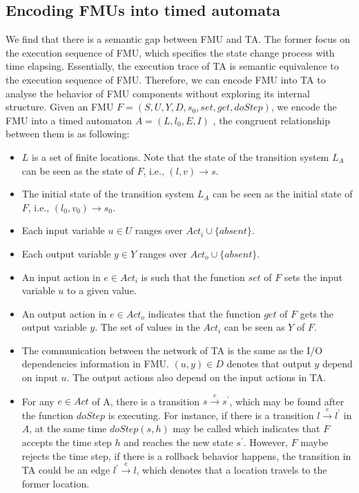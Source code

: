 \subsection{Encoding FMUs into timed automata}
We find that there is a semantic gap between FMU and TA. The former focus on the execution sequence of FMU, which specifies the state change process with time elapsing. Essentially, the execution trace of TA is semantic equivalence to the execution sequence of FMU. Therefore, we can encode FMU into TA to analyse the behavior of FMU components without exploring its internal structure. 
Given an FMU $F=(S,U,Y,D,s_{0},set,get,doStep)$, we encode the FMU into a timed automaton $\textit{A}=(L,l_{0},E,I)$ , the congruent relationship between them is as following:
\begin{itemize}
\item
$L$ is a set of finite locations. Note that the state of the transition system $L_{\textit{A}}$ can be seen as the state of $F$, i.e., $(l,v) \rightarrow s$.
\item
The initial state of the transition system $L_{\textit{A}}$ can be seen as the initial state of $F$, i.e., $(l_{0},v_{0}) \rightarrow s_{0}$. 
\item
Each input variable $u \in U$ ranges over $Act_{i} \cup \{absent\}$.
\item
Each output variable $y \in Y$ ranges over $Act_{o} \cup \{absent\}$.
\item
An input action in $e \in Act_{i}$ is such that the function $set$ of $F$ sets the input variable $u$ to a given value. 
\item
An output action in $e \in Act_{o}$ indicates that the function $get$ of $F$ gets the output variable $y$. The set of values in the $Act_{i}$ can be seen as $Y$ of $F$.  
\item
The communication between the network of TA is the same as the I/O dependencies information in FMU. $(u,y) \in D$ denotes that output $y$ depend on input $u$. The output actions also depend on the input actions in TA.
\item
For any $e \in Act$ of A, there is a transition $s \xrightarrow{e} s^{\prime}$, which may be found after the function $doStep$ is executing. For instance, if there is a transition $l \xrightarrow{e} l^{\prime}$ in $A$, at the same time $doStep(s,h)$ may be called which indicates that $F$ accepts the time step $h$ and reaches the new state $s^{\prime}$. However, $F$ maybe rejects the time step, if there is a rollback behavior happens, the transition in TA could be an edge $l^{\prime} \xrightarrow{e} l$, which denotes that a location travels to the former location.

\end{itemize}
